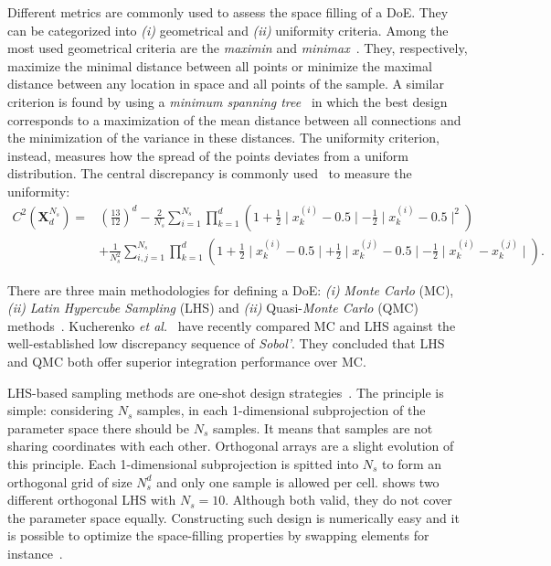 Different metrics are commonly used to assess the space filling of a DoE. They can be categorized into \emph{(i)} geometrical and \emph{(ii)} uniformity criteria. Among the most used geometrical criteria are the \emph{maximin} and \emph{minimax}~\citep{Pronzato2017}. They, respectively, maximize the minimal distance between all points or minimize the maximal distance between any location in space and all points of the sample. A similar criterion is found by using a \emph{minimum spanning tree}~\citep{Franco2009} in which the best design corresponds to a maximization of the mean distance between all connections and the minimization of the variance in these distances. The uniformity criterion, instead, measures how the spread of the points deviates from a uniform distribution. The central discrepancy is commonly used~\citep{Fang2006,Damblin2013} to measure the uniformity:
\begin{align}
C^2(\mathbf{X}^{N_s}_d) =& \left( \frac{13}{12} \right)^d - \frac{2}{N_s}\displaystyle\sum_{i=1}^{N_s}\prod_{k=1}^{d} \left( 1 + \frac{1}{2} \mid  x_k^{(i)} - 0.5\mid - \frac{1}{2} \mid  x_k^{(i)} - 0.5\mid^2\right)\\ \nonumber
& + \frac{1}{N_s^2}\sum_{i,j=1}^{N_s}\prod_{k=1}^d \left( 1 + \frac{1}{2} \mid  x_k^{(i)} - 0.5\mid + \frac{1}{2} \mid  x_k^{(j)} - 0.5\mid - \frac{1}{2} \mid  x_k^{(i)} - x_k^{(j)}\mid \right). \label{eq:c2}
\end{align}

There are three main methodologies for defining a DoE: \emph{(i)} \emph{Monte Carlo} (MC), \emph{(ii)} \emph{Latin Hypercube Sampling} (LHS) and \emph{(ii)} Quasi-\emph{Monte Carlo} (QMC) methods~\citep{Cavazzuti2013,Garud2017}. Kucherenko \emph{et al.}~\citep{Kucherenko2015} have recently compared MC and LHS against the well-established low discrepancy sequence of \emph{Sobol'}. They concluded that LHS and QMC both offer superior integration performance over MC.

LHS-based sampling methods are one-shot design strategies~\citep{Mckay1979,Fang2006}. The principle is simple: considering $N_s$ samples, in each 1-dimensional subprojection of the parameter space there should be $N_s$ samples. It means that samples are not sharing coordinates with each other. Orthogonal arrays are a slight evolution of this principle. Each 1-dimensional subprojection is spitted into $N_s$ to form an orthogonal grid of size $N_s^d$ and only one sample is allowed per cell.  shows two different orthogonal LHS with $N_s=10$. Although both valid, they do not cover the parameter space equally. Constructing such design is numerically easy and it is possible to optimize the space-filling properties by swapping elements for instance~\cite{Fang2006,Damblin2013}.

